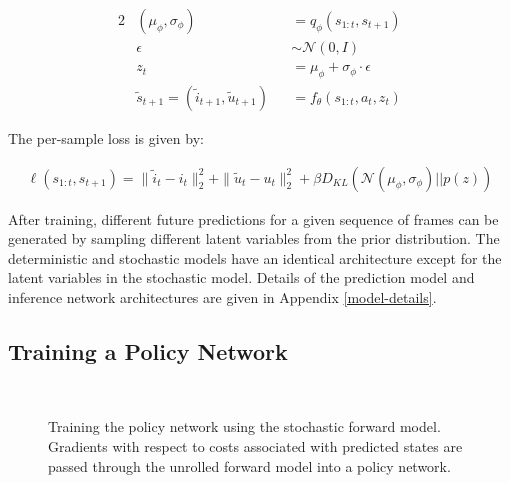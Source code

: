 \documentclass{article} %
\begin{document}
\begin{alignat}{2}
  \label{eq:update-eqn}
  &(\mu_\phi, \sigma_\phi) &&= q_\phi(s_{1:t}, s_{t+1}) \\
  &\epsilon &&\sim \mathcal{N}(0, I) \\
  &z_t &&= \mu_\phi + \sigma_\phi \cdot \epsilon \\
  &\tilde{s}_{t+1} = (\tilde{i}_{t+1}, \tilde{u}_{t+1}) &&= f_\theta(s_{1:t}, a_t, z_t)
\end{alignat}

The per-sample loss is given by:

\begin{align}
  \label{eq:update-eqn}
  \ell(s_{1:t}, s_{t+1}) = \|\tilde{i}_t - i_t \|_2^2 + \| \tilde{u}_t - u_t \|_2^2 + \beta D_{KL}(\mathcal{N}(\mu_\phi, \sigma_\phi) || p(z))
\end{align}

After training, different future predictions for a given sequence of frames can be generated by sampling different latent variables from the prior distribution.
The deterministic and stochastic models have an identical architecture except for the latent variables in the stochastic model.
Details of the prediction model and inference network architectures are given in Appendix \ref{model-details}.

\subsection{Training a Policy Network}


\begin{figure}[t!]
    \centering
     \\
    \label{svg}
    \caption{Training the policy network using the stochastic forward model. Gradients with respect to costs associated with predicted states are passed through the unrolled forward model into a policy network.}
\end{figure}
\end{document}
